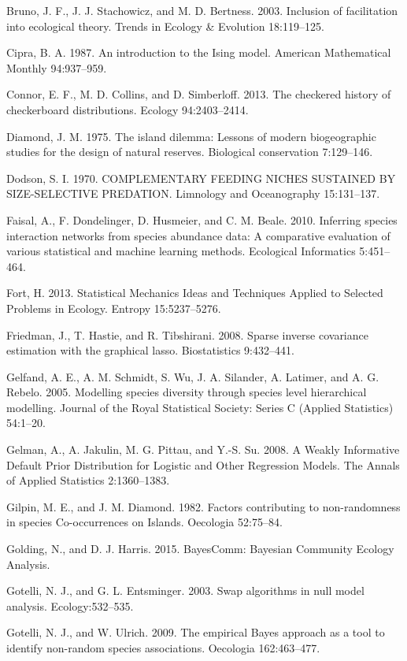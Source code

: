 \documentclass[12pt,]{article}
\begin{document}
\begin{spacing}{1.9}
\begin{flushleft}
Bruno, J. F., J. J. Stachowicz, and M. D. Bertness. 2003. Inclusion of
facilitation into ecological theory. Trends in Ecology \& Evolution
18:119--125.

Cipra, B. A. 1987. An introduction to the Ising model. American
Mathematical Monthly 94:937--959.

Connor, E. F., M. D. Collins, and D. Simberloff. 2013. The checkered
history of checkerboard distributions. Ecology 94:2403--2414.

Diamond, J. M. 1975. The island dilemma: Lessons of modern biogeographic
studies for the design of natural reserves. Biological conservation
7:129--146.

Dodson, S. I. 1970. COMPLEMENTARY FEEDING NICHES SUSTAINED BY
SIZE-SELECTIVE PREDATION. Limnology and Oceanography 15:131--137.

Faisal, A., F. Dondelinger, D. Husmeier, and C. M. Beale. 2010.
Inferring species interaction networks from species abundance data: A
comparative evaluation of various statistical and machine learning
methods. Ecological Informatics 5:451--464.

Fort, H. 2013. Statistical Mechanics Ideas and Techniques Applied to
Selected Problems in Ecology. Entropy 15:5237--5276.

Friedman, J., T. Hastie, and R. Tibshirani. 2008. Sparse inverse
covariance estimation with the graphical lasso. Biostatistics
9:432--441.

Gelfand, A. E., A. M. Schmidt, S. Wu, J. A. Silander, A. Latimer, and A.
G. Rebelo. 2005. Modelling species diversity through species level
hierarchical modelling. Journal of the Royal Statistical Society: Series
C (Applied Statistics) 54:1--20.

Gelman, A., A. Jakulin, M. G. Pittau, and Y.-S. Su. 2008. A Weakly
Informative Default Prior Distribution for Logistic and Other Regression
Models. The Annals of Applied Statistics 2:1360--1383.

Gilpin, M. E., and J. M. Diamond. 1982. Factors contributing to
non-randomness in species Co-occurrences on Islands. Oecologia
52:75--84.

Golding, N., and D. J. Harris. 2015. BayesComm: Bayesian Community
Ecology Analysis.

Gotelli, N. J., and G. L. Entsminger. 2003. Swap algorithms in null
model analysis. Ecology:532--535.

Gotelli, N. J., and W. Ulrich. 2009. The empirical Bayes approach as a
tool to identify non-random species associations. Oecologia
162:463--477.


\end{flushleft}
\end{spacing}
\end{document}
